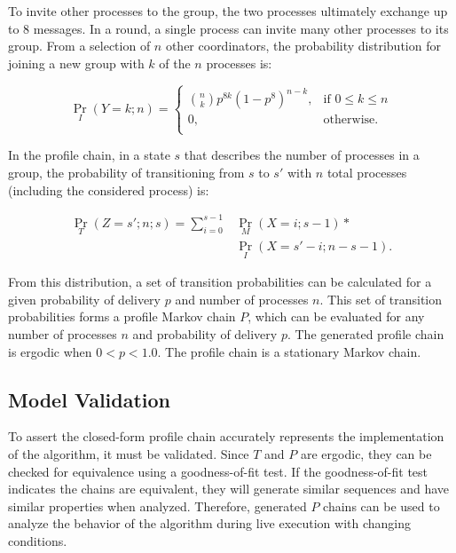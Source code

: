 To invite other processes to the group, the two processes ultimately exchange up to 8 messages.
In a round, a single process can invite many other processes to its group.
From a selection of $n$ other coordinators, the probability distribution for joining a new group with $k$ of the $n$ processes is:

\begin{equation}
    \Pr_{I}(Y=k; n) =
    \begin{cases}
        \binom{n}{k} p^{8k}(1-p^8)^{n-k}, & \text{if } 0 \leq k \leq n \\
        0,                                & \text{otherwise.} \\
    \end{cases}
\end{equation}

In the profile chain, in a state $s$ that describes the number of processes in a group, the probability of transitioning from $s$ to $s'$ with $n$ total processes (including the considered process) is:

\begin{align} \Pr_{T}(Z=s'; n; s) = \sum_{i=0}^{s-1} &\Pr_{M}(X=i; s-1) *
\nonumber \\ &\Pr_{I}(X=s'-i; n-s-1).\end{align}

From this distribution, a set of transition probabilities can be calculated for a given probability of delivery $p$ and number of processes $n$.
This set of transition probabilities forms a profile Markov chain $P$, which can be evaluated for any number of processes $n$ and probability of delivery $p$.
The generated profile chain is ergodic when $0<p<1.0$. The profile chain is a stationary Markov chain.

\subsection{Model Validation}


To assert the closed-form profile chain accurately represents the implementation of the algorithm, it must be validated.
Since $T$ and $P$ are ergodic, they can be checked for equivalence using a goodness-of-fit test.
If the goodness-of-fit test indicates the chains are equivalent, they will generate similar sequences and have similar properties when analyzed.
Therefore, generated $P$ chains can be used to analyze the behavior of the algorithm during live execution with changing conditions.

